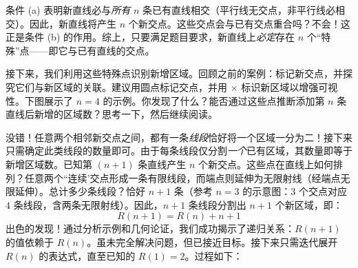 条件 (a) 表明新直线必与\emph{所有} $n$ 条已有直线相交（平行线无交点，非平行线必相交）。因此，新直线将产生 $n$ 个新交点。这些交点会与已有交点重合吗？不会！这正是条件 (b) 的作用。综上，只要满足题目要求，新直线上\emph{必定}存在 $n$ 个``特殊''点——即它与已有直线的交点。

接下来，我们利用这些特殊点识别新增区域。回顾之前的案例：标记新交点，并探究它们与新区域的关联。建议用圆点标记交点，并用 $\textbf{×}$ 标识新区域以增强可视性。下图展示了 $n = 4$ 的示例。你发现了什么？能否通过这些点推断添加第 $n$ 条直线后新增的区域数？思考一下，然后继续阅读。

\begin{center}
\end{center}

没错！任意两个相邻新交点之间，都有一条\emph{线段}恰好将一个区域一分为二！接下来只需确定此类线段的数量即可。由于每条线段仅分割\emph{一个}已有区域，其数量即等于新增区域数。已知第 $(n + 1)$ 条直线产生 $n$ 个新交点。这些点在直线上如何排列？任意两个``连续'交点形成一条有限线段，而端点则延伸为无限射线（经端点无限延伸）。总计多少条线段？恰好 $n + 1$ 条（参考 $n = 3$ 的示意图：$3$ 个交点对应 $4$ 条线段，含两条无限射线）。因此，$n + 1$ 条线段分割出 $n + 1$ 个新区域，即：
\[R(n + 1) = R(n) + n + 1\]
出色的发现！通过分析示例和几何论证，我们成功揭示了递归关系：$R(n+1)$ 的值依赖于 $R(n)$。虽未完全解决问题，但已接近目标。接下来只需迭代展开 $R(n)$ 的表达式，直至已知的 $R(1) = 2$。过程如下：

